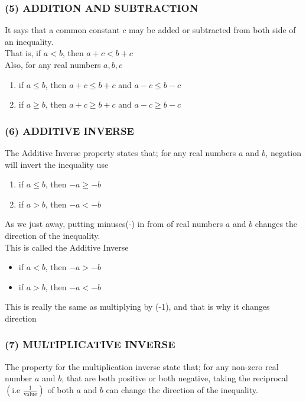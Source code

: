 \documentclass[12pt]{report}
\newcommand{\spn}[1]{\\[#1cm]}
\newcommand{\NI}{\noindent}
\begin{document}
	\subsubsection{(5) ADDITION AND SUBTRACTION}
	It says that a common constant $c$ may be added or subtracted from both side of an inequality.\\
	That is, if $a<b$, then $a+c < b + c$\\
	
	\NI Also, for any real numbers $a, b, c$
	\begin{enumerate}
		\item if $a\leq b$, then $a+c \leq b+c$ and $a-c \leq b-c$
		
		\item if $a\geq b$, then $a+c \geq b+c$ and $a-c \geq b-c$
	\end{enumerate}
	
	\subsubsection{(6) ADDITIVE INVERSE}
	The Additive Inverse property states that; for any real numbers $a$ and $b$, negation will invert the inequality use
	\begin{enumerate}
		\item if $a \leq b$, then $-a \geq -b$
		
		\item if $a>b$, then $-a < -b$
	\end{enumerate}
	
	\NI As we just away, putting minuses(-) in from of real numbers $a$ and $b$ changes the direction of the inequality.\spn{0.3}
	This is called the Additive Inverse
	\begin{itemize}
		\item if $a<b$, then $-a > -b$
		\item if $a>b$, then $-a < -b$
	\end{itemize}
	
	\NI This is really the same as multiplying by (-1), and that is why it changes direction
	
	\subsubsection{(7) MULTIPLICATIVE INVERSE}
	The property for the multiplication inverse state that; for any non-zero real number $a$ and $b$, that are both positive or both negative, taking the reciprocal $\left(\text{i.e } \frac{1}{\text{value}}\right)$ of both $a$ and $b$ can change the direction of the inequality.\\
	
\end{document}
